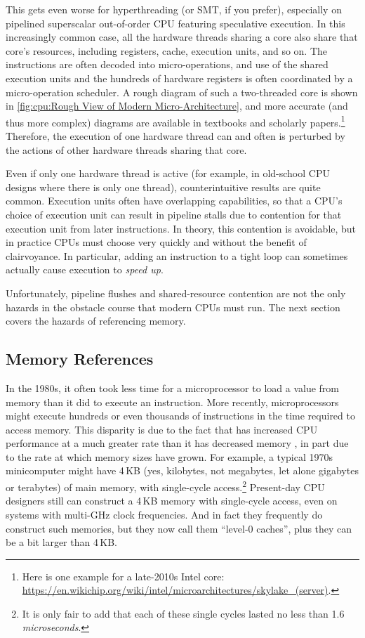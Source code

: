 This gets even worse for hyperthreading (or SMT, if you prefer),
especially on pipelined superscalar out-of-order CPU featuring speculative
execution.
In this increasingly common case, all the hardware threads sharing
a core also share that core's resources, including registers, cache,
execution units, and so on.
The instructions are often decoded into micro-operations, and use of the
shared execution units and the hundreds of hardware registers is often
coordinated by a micro-operation scheduler.
A rough diagram of such a two-threaded core is shown in
\cref{fig:cpu:Rough View of Modern Micro-Architecture},
and more accurate (and thus more complex) diagrams are available in
textbooks and scholarly papers.\footnote{
	Here is one example for a late-2010s Intel core:
	\url{https://en.wikichip.org/wiki/intel/microarchitectures/skylake_(server)}.}
Therefore, the execution of one hardware thread can and often is perturbed
by the actions of other hardware threads sharing that core.

Even if only one hardware thread is active (for example, in old-school
CPU designs where there is only one thread), counterintuitive results
are quite common.
Execution units often have overlapping capabilities, so that a CPU's
choice of execution unit can result in pipeline stalls due to contention
for that execution unit from later instructions.
In theory, this contention is avoidable, but in practice CPUs must choose
very quickly and without the benefit of clairvoyance.
In particular, adding an instruction to a tight loop can sometimes
actually cause execution to \emph{speed up}.

Unfortunately, pipeline flushes and shared-resource contention are not
the only hazards in the obstacle course that modern CPUs must run.
The next section covers the hazards of referencing memory.

\subsection{Memory References}
\label{sec:cpu:Memory References}

In the 1980s, it often took less time for a microprocessor to load a value
from memory than it did to execute an instruction.
More recently, microprocessors might execute hundreds or even thousands
of instructions in the time required to access memory.
This disparity is due to the fact that  has increased CPU
performance at a much greater rate than it has decreased memory ,
in part due to the rate at which memory sizes have grown.
For example, a typical 1970s minicomputer might have 4\,KB (yes, kilobytes,
not megabytes, let alone gigabytes or terabytes) of main memory, with
single-cycle access.\footnote{
	It is only fair to add that each of these single cycles
	lasted no less than 1.6 \emph{microseconds}.}
Present-day CPU designers still can construct a 4\,KB memory with single-cycle
access, even on systems with multi-GHz clock frequencies.
And in fact they frequently do construct such memories, but they now
call them ``level-0 caches'', plus they can be a bit larger than 4\,KB.

